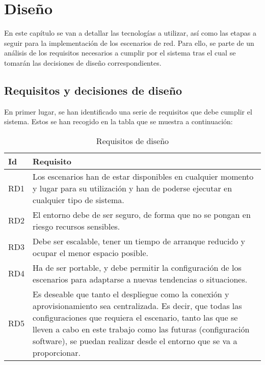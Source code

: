 \chapter{Diseño} \label{ch:dis}
  En este capítulo se van a detallar las tecnologías a utilizar, así como las etapas a seguir para la implementación de los escenarios de red. Para ello, se parte de un análisis de los requisitos necesarios a cumplir por el sistema tras el cual se tomarán las decisiones de diseño correspondientes.

\section{Requisitos y decisiones de diseño} \label{sec:req}
  En primer lugar, se han identificado una serie de requisitos que debe cumplir el sistema. Estos se han recogido en la tabla que se muestra a continuación:

  \begin{table}[h]
    \begin{center}
      \begin{tabular}{ | w{c}{1cm} | m{14cm} | }
        \hline{} \textbf{Id} & \textbf{Requisito} \\ \hline
        RD1 & Los escenarios han de estar disponibles en cualquier momento y lugar para su utilización y han de poderse ejecutar en cualquier tipo de sistema. \\ \hline{}
        RD2 & El entorno debe de ser seguro, de forma que no se pongan en riesgo recursos sensibles. \\ \hline
        RD3 & Debe ser escalable, tener un tiempo de arranque reducido y ocupar el menor espacio posible. \\ \hline{}
        RD4 & Ha de ser portable, y debe permitir la configuración de los escenarios para adaptarse a nuevas tendencias o situaciones.  \\ \hline
        RD5 & Es deseable que tanto el despliegue como la conexión y aprovisionamiento sea centralizada. Es decir, que todas las configuraciones que requiera el escenario, tanto las que se lleven a cabo en este trabajo como las futuras (configuración software), se puedan realizar desde el entorno que se va a proporcionar. \\ \hline
      \end{tabular}
      \caption{Requisitos de diseño}
      \label{tab:reqs}
    \end{center}
  \end{table}

